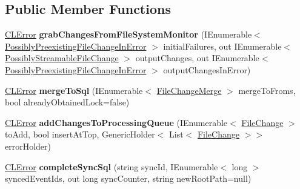 \subsection*{Public Member Functions}
\begin{DoxyCompactItemize}
\item 
\hypertarget{interface_cloud_api_public_1_1_interfaces_1_1_i_sync_data_object_a137b9a4ce8e5ec066bd55933d9d4ed2f}{\hyperlink{class_cloud_api_public_1_1_model_1_1_c_l_error}{C\-L\-Error} {\bfseries grab\-Changes\-From\-File\-System\-Monitor} (I\-Enumerable$<$ \hyperlink{struct_cloud_api_public_1_1_model_1_1_possibly_preexisting_file_change_in_error}{Possibly\-Preexisting\-File\-Change\-In\-Error} $>$ initial\-Failures, out I\-Enumerable$<$ \hyperlink{struct_cloud_api_public_1_1_model_1_1_possibly_streamable_file_change}{Possibly\-Streamable\-File\-Change} $>$ output\-Changes, out I\-Enumerable$<$ \hyperlink{struct_cloud_api_public_1_1_model_1_1_possibly_preexisting_file_change_in_error}{Possibly\-Preexisting\-File\-Change\-In\-Error} $>$ output\-Changes\-In\-Error)}\label{interface_cloud_api_public_1_1_interfaces_1_1_i_sync_data_object_a137b9a4ce8e5ec066bd55933d9d4ed2f}

\item 
\hypertarget{interface_cloud_api_public_1_1_interfaces_1_1_i_sync_data_object_ae14b71e4964bc0cf9d5fbf563a05545e}{\hyperlink{class_cloud_api_public_1_1_model_1_1_c_l_error}{C\-L\-Error} {\bfseries merge\-To\-Sql} (I\-Enumerable$<$ \hyperlink{struct_cloud_api_public_1_1_model_1_1_file_change_merge}{File\-Change\-Merge} $>$ merge\-To\-Froms, bool already\-Obtained\-Lock=false)}\label{interface_cloud_api_public_1_1_interfaces_1_1_i_sync_data_object_ae14b71e4964bc0cf9d5fbf563a05545e}

\item 
\hypertarget{interface_cloud_api_public_1_1_interfaces_1_1_i_sync_data_object_aa1863eed2344565068c951e0c4c0c22e}{\hyperlink{class_cloud_api_public_1_1_model_1_1_c_l_error}{C\-L\-Error} {\bfseries add\-Changes\-To\-Processing\-Queue} (I\-Enumerable$<$ \hyperlink{class_cloud_api_public_1_1_model_1_1_file_change}{File\-Change} $>$ to\-Add, bool insert\-At\-Top, Generic\-Holder$<$ List$<$ \hyperlink{class_cloud_api_public_1_1_model_1_1_file_change}{File\-Change} $>$$>$ error\-Holder)}\label{interface_cloud_api_public_1_1_interfaces_1_1_i_sync_data_object_aa1863eed2344565068c951e0c4c0c22e}

\item 
\hypertarget{interface_cloud_api_public_1_1_interfaces_1_1_i_sync_data_object_aa702b66aae31ba25cc10138182944db7}{\hyperlink{class_cloud_api_public_1_1_model_1_1_c_l_error}{C\-L\-Error} {\bfseries complete\-Sync\-Sql} (string sync\-Id, I\-Enumerable$<$ long $>$ synced\-Event\-Ids, out long sync\-Counter, string new\-Root\-Path=null)}\label{interface_cloud_api_public_1_1_interfaces_1_1_i_sync_data_object_aa702b66aae31ba25cc10138182944db7}


\end{DoxyCompactItemize}
